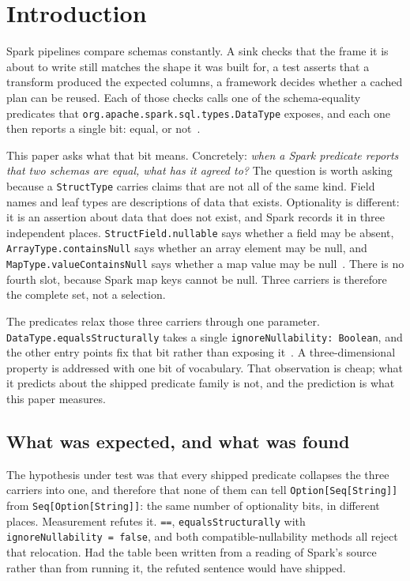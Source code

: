 \section{Introduction}

Spark pipelines compare schemas constantly. A sink checks that the frame it is about to write still matches the shape it was built for, a test asserts that a transform produced the expected columns, a framework decides whether a cached plan can be reused. Each of those checks calls one of the schema-equality predicates that \texttt{org.apache.spark.sql.types.DataType} exposes, and each one then reports a single bit: equal, or not~\cite{spark_datatype}.

This paper asks what that bit means. Concretely: \emph{when a Spark predicate reports that two schemas are equal, what has it agreed to?} The question is worth asking because a \texttt{StructType} carries claims that are not all of the same kind. Field names and leaf types are descriptions of data that exists. Optionality is different: it is an assertion about data that does not exist, and Spark records it in three independent places. \texttt{StructField.nullable} says whether a field may be absent, \texttt{ArrayType.containsNull} says whether an array element may be null, and \texttt{MapType.valueContainsNull} says whether a map value may be null~\cite{spark_structtype}. There is no fourth slot, because Spark map keys cannot be null. Three carriers is therefore the complete set, not a selection.

The predicates relax those three carriers through one parameter. \texttt{DataType.equalsStructurally} takes a single \texttt{ignoreNullability: Boolean}, and the other entry points fix that bit rather than exposing it~\cite{spark_source_datatype}. A three-dimensional property is addressed with one bit of vocabulary. That observation is cheap; what it predicts about the shipped predicate family is not, and the prediction is what this paper measures.

\subsection{What was expected, and what was found}
\label{sec:refutation}

The hypothesis under test was that every shipped predicate collapses the three carriers into one, and therefore that none of them can tell \texttt{Option[Seq[String]]} from \texttt{Seq[Option[String]]}: the same number of optionality bits, in different places. Measurement refutes it. \texttt{==}, \texttt{equalsStructurally} with \texttt{ignoreNullability = false}, and both compatible-nullability methods all reject that relocation. Had the table been written from a reading of Spark's source rather than from running it, the refuted sentence would have shipped.

